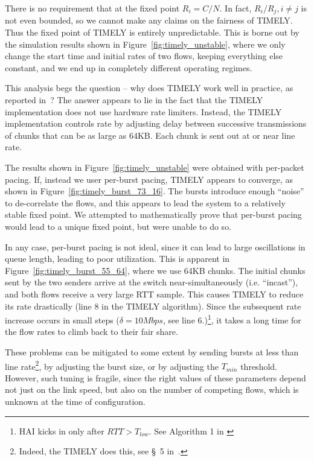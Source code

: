 There is no requirement that at the fixed point $R_i = {C}/{N}$. In fact,
${R_{i}}/{R_{j}}, i \ne j$ is not even bounded, so we cannot make any
claims on the fairness of TIMELY. Thus the fixed point of TIMELY is entirely
unpredictable. This is borne out by the simulation results shown in
Figure~\ref{fig:timely_unstable}, where we only change the start time and
initial rates of two flows, keeping everything else constant, and we end up in
completely different operating regimes.

This analysis begs the question -- why does TIMELY work well in practice, as
reported in~\cite{timely}? The answer appears to lie in the fact that the TIMELY
implementation does not use hardware rate limiters.  Instead, the TIMELY
implementation controls rate by adjusting delay between successive transmissions
of chunks that can be as large as 64KB. Each chunk is sent out at or near line rate.

The results shown in Figure~\ref{fig:timely_unstable} were obtained with
per-packet pacing. If, instead we user per-burst pacing, TIMELY appears to
converge, as shown in Figure~\ref{fig:timely_burst_73_16}. The bursts introduce
enough ``noise'' to de-correlate the flows, and this appears to lead the system
to a relatively stable fixed point. We attempted to mathematically prove that
per-burst pacing would lead to a unique fixed point, but were unable to do so.

In any case, per-burst pacing is not ideal, since it can lead to large
oscillations in queue length, leading to poor utilization. This is apparent in
Figure~\ref{fig:timely_burst_55_64}, where we use 64KB chunks. The initial
chunks sent by the two senders arrive at the switch near-simultaneously (i.e.
``incast''), and both flows receive a very large RTT sample. This causes TIMELY
to reduce its rate drastically (line 8 in the TIMELY algorithm). Since the
subsequent rate increase occurs in small steps ($\delta = 10Mbps$, see line
6.)\footnote{HAI kicks in only after $RTT > T_{low}$. See Algorithm 1 in \cite{timely}}, it takes a long time for the flow rates to climb back to their fair
share. 

These problems can be mitigated to some extent by sending bursts at less than
line rate\footnote{Indeed, the TIMELY does this, see \S~5
in~\cite{timely}.}, by adjusting the burst size, or by adjusting the $T_{min}$
threshold. However, such tuning is fragile, since the right values of these
parameters depend not just on the link speed, but also on the number of
competing flows, which is unknown at the time of configuration. 

